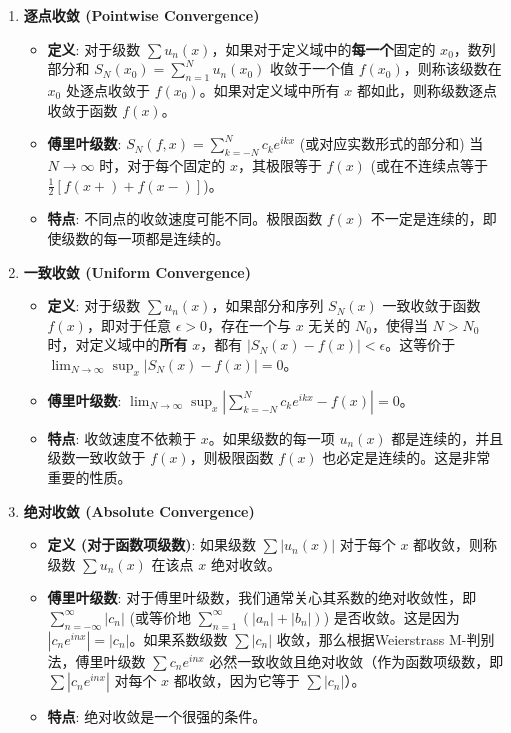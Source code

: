 \begin{enumerate}
	\item \textbf{逐点收敛 (Pointwise Convergence)}
	\begin{itemize}
		\item \textbf{定义}: 对于级数 $\sum u_n(x)$，如果对于定义域中的\textbf{每一个}固定的 $x_0$，数列部分和 $S_N(x_0) = \sum_{n=1}^N u_n(x_0)$ 收敛于一个值 $f(x_0)$，则称该级数在 $x_0$ 处逐点收敛于 $f(x_0)$。如果对定义域中所有 $x$ 都如此，则称级数逐点收敛于函数 $f(x)$。
		\item \textbf{傅里叶级数}: $S_N(f,x) = \sum_{k=-N}^{N} c_k e^{ikx}$ (或对应实数形式的部分和) 当 $N \to \infty$ 时，对于每个固定的 $x$，其极限等于 $f(x)$ (或在不连续点等于 $\frac{1}{2}[f(x+)+f(x-)]$)。
		\item \textbf{特点}: 不同点的收敛速度可能不同。极限函数 $f(x)$ 不一定是连续的，即使级数的每一项都是连续的。
	\end{itemize}
	\item \textbf{一致收敛 (Uniform Convergence)}
	\begin{itemize}
		\item \textbf{定义}: 对于级数 $\sum u_n(x)$，如果部分和序列 $S_N(x)$ 一致收敛于函数 $f(x)$，即对于任意 $\epsilon > 0$，存在一个与 $x$ 无关的 $N_0$，使得当 $N > N_0$ 时，对定义域中的\textbf{所有} $x$，都有 $|S_N(x) - f(x)| < \epsilon$。这等价于 $\lim_{N \to \infty} \sup_x |S_N(x) - f(x)| = 0$。
		\item \textbf{傅里叶级数}: $\lim_{N \to \infty} \sup_x |\sum_{k=-N}^{N} c_k e^{ikx} - f(x)| = 0$。
		\item \textbf{特点}: 收敛速度不依赖于 $x$。如果级数的每一项 $u_n(x)$ 都是连续的，并且级数一致收敛于 $f(x)$，则极限函数 $f(x)$ 也必定是连续的。这是非常重要的性质。
	\end{itemize}
	\item \textbf{绝对收敛 (Absolute Convergence)}
	\begin{itemize}
		\item \textbf{定义 (对于函数项级数)}: 如果级数 $\sum |u_n(x)|$ 对于每个 $x$ 都收敛，则称级数 $\sum u_n(x)$ 在该点 $x$ 绝对收敛。
		\item \textbf{傅里叶级数}: 对于傅里叶级数，我们通常关心其系数的绝对收敛性，即 $\sum_{n=-\infty}^{\infty} |c_n|$ (或等价地 $\sum_{n=1}^{\infty} (|a_n| + |b_n|)$) 是否收敛。这是因为 $|c_n e^{inx}| = |c_n|$。如果系数级数 $\sum |c_n|$ 收敛，那么根据Weierstrass M-判别法，傅里叶级数 $\sum c_n e^{inx}$ 必然一致收敛且绝对收敛（作为函数项级数，即 $\sum |c_n e^{inx}|$ 对每个 $x$ 都收敛，因为它等于 $\sum |c_n|$）。
		\item \textbf{特点}: 绝对收敛是一个很强的条件。
	\end{itemize}
\end{enumerate}

